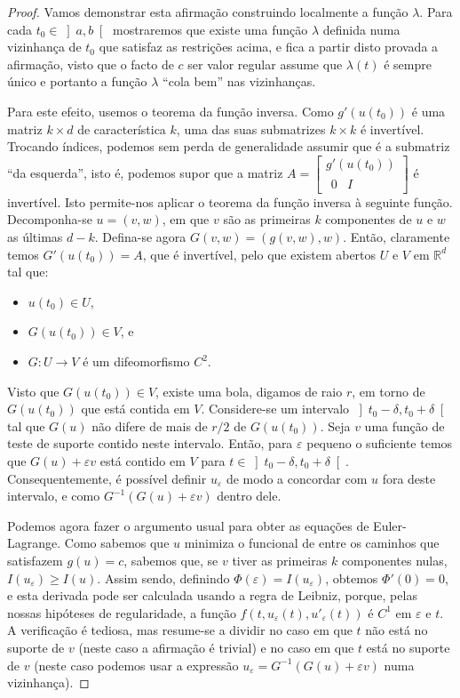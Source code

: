 \documentclass{article}
\theoremstyle{nonumberplain}
\theoremstyle{nonumberplain}
\newtheorem{proof}{Proof}
\newcommand{\R}{\mathbb{R}}
\begin{document}
\begin{proof}
Vamos demonstrar esta afirmação construindo localmente a função $\lambda$. Para cada $t_0 \in \left]a,b\right[$ mostraremos que existe uma função $\lambda$ definida numa vizinhança de $t_0$ que satisfaz as restrições acima, e fica a partir disto provada a afirmação, visto que o facto de $c$ ser valor regular assume que $\lambda(t)$ é sempre único e portanto a função $\lambda$ ``cola bem'' nas vizinhanças.

Para este efeito, usemos o teorema da função inversa. Como $g'(u(t_0))$ é uma matriz $k \times d$ de característica $k$, uma das suas submatrizes $k \times k$ é invertível. Trocando índices, podemos sem perda de generalidade assumir que é a submatriz ``da esquerda'', isto é, podemos supor que a matriz
$
A = \begin{bmatrix}
g'(u(t_0))\\
\begin{matrix}
0 & I
\end{matrix}
\end{bmatrix}
$
é invertível. Isto permite-nos aplicar o teorema da função inversa à seguinte função. Decomponha-se $u = (v, w)$, em que $v$ são as primeiras $k$ componentes de $u$ e $w$ as últimas $d-k$. Defina-se agora $G(v,w) = (g(v,w),w)$. Então, claramente temos $G'(u(t_0)) = A$, que é invertível, pelo que existem abertos $U$ e $V$ em $\R^d$ tal que:
\begin{itemize}
\item $u(t_0) \in U$,
\item $G(u(t_0)) \in V$, e
\item $G \colon U \to V$ é um difeomorfismo $C^2$.
\end{itemize}

Visto que $G(u(t_0)) \in V$, existe uma bola, digamos de raio $r$, em torno de $G(u(t_0))$ que está contida em $V$. Considere-se um intervalo $\left]t_0-\delta, t_0 + \delta\right[$ tal que $G(u)$ não difere de mais de $r/2$ de $G(u(t_0))$. Seja $v$ uma função de teste de suporte contido neste intervalo. Então, para $\varepsilon$ pequeno o suficiente temos que $G(u) + \varepsilon v$ está contido em $V$ para $t \in \left]t_0-\delta,t_0+\delta\right[$. Consequentemente, é possível definir $u_\varepsilon$ de modo a concordar com $u$ fora deste intervalo, e como $G^{-1}(G(u) + \varepsilon v)$ dentro dele.

Podemos agora fazer o argumento usual para obter as equações de Euler-Lagrange. Como sabemos que $u$ minimiza o funcional de entre os caminhos que satisfazem $g(u) = c$, sabemos que, se $v$ tiver as primeiras $k$ componentes nulas, $I(u_\varepsilon) \geq I(u)$. Assim sendo, definindo $\Phi(\varepsilon) = I(u_\varepsilon)$, obtemos $\Phi'(0) = 0$, e esta derivada pode ser calculada usando a regra de Leibniz, porque, pelas nossas hipóteses de regularidade, a função $f(t, u_\varepsilon(t), u'_\varepsilon(t))$ é $C^1$ em $\varepsilon$ e $t$. A verificação é tediosa, mas resume-se a dividir no caso em que $t$ não está no suporte de $v$ (neste caso a afirmação é trivial) e no caso em que $t$ está no suporte de $v$ (neste caso podemos usar a expressão $u_\varepsilon = G^{-1}(G(u) + \varepsilon v)$ numa vizinhança).


\end{proof}
\end{document}
